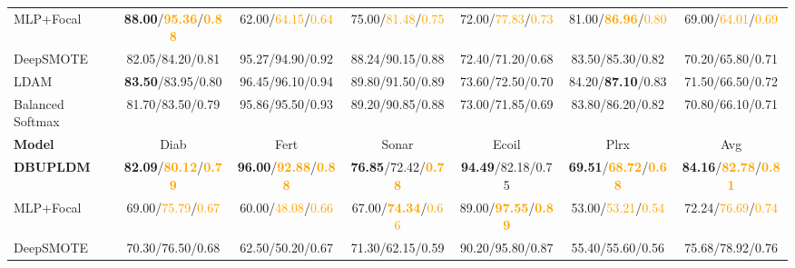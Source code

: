 \documentclass[a4paper]{cas-sc}
\begin{document}
\begin{table}[htbp]
{\begin{tabular}{lcccccc}
    MLP+Focal        & \textbf{88.00}/\textbf{\textcolor{orange}{95.36}}/\textbf{\textcolor{orange}{0.88}} & 62.00/\textcolor{orange}{64.15}/\textcolor{orange}{0.64} & 75.00/\textcolor{orange}{81.48}/\textcolor{orange}{0.75} & 72.00/\textcolor{orange}{77.83}/\textcolor{orange}{0.73} & 81.00/\textbf{\textcolor{orange}{86.96}}/\textcolor{orange}{0.80} & 69.00/\textcolor{orange}{64.01}/\textcolor{orange}{0.69} \\
    {\color{magenta}DeepSMOTE} & {\color{magenta}82.05/84.20/0.81} & {\color{magenta}95.27/94.90/0.92} & {\color{magenta}88.24/90.15/0.88} & {\color{magenta}72.40/71.20/0.68} & {\color{magenta}83.50/85.30/0.82} & {\color{magenta}70.20/65.80/0.71} \\
    {\color{magenta}LDAM} & {\color{magenta}\textbf{83.50}/83.95/0.80} & {\color{magenta}96.45/96.10/0.94} & {\color{magenta}89.80/91.50/0.89} & {\color{magenta}73.60/72.50/0.70} & {\color{magenta}84.20/\textbf{87.10}/0.83} & {\color{magenta}71.50/66.50/0.72} \\
    {\color{magenta}Balanced Softmax} & {\color{magenta}81.70/83.50/0.79} & {\color{magenta}95.86/95.50/0.93} & {\color{magenta}89.20/90.85/0.88} & {\color{magenta}73.00/71.85/0.69} & {\color{magenta}83.80/86.20/0.82} & {\color{magenta}70.80/66.10/0.71} \\
    \midrule
    \textbf{Model} & Diab & Fert & Sonar & Ecoil & Plrx & Avg \\
    \midrule
    \textbf{DBUPLDM} & \textbf{82.09}/\textbf{\textcolor{orange}{80.12}}/\textbf{\textcolor{orange}{0.79}} & \textbf{96.00}/\textbf{\textcolor{orange}{92.88}}/\textbf{\textcolor{orange}{0.88}} & \textbf{76.85}/{\color{orange}72.42}/\textbf{\textcolor{orange}{0.78}} & \textbf{94.49}/{\color{orange}82.18}/{\color{orange}0.75} & \textbf{69.51}/\textbf{\textcolor{orange}{68.72}}/\textbf{\textcolor{orange}{0.68}} & \textbf{84.16}/\textbf{\textcolor{orange}{82.78}}/\textbf{\textcolor{orange}{0.81}} \\
    MLP+Focal        & 69.00/\textcolor{orange}{75.79}/\textcolor{orange}{0.67} & 60.00/\textcolor{orange}{48.08}/\textcolor{orange}{0.66} & 67.00/\textbf{\textcolor{orange}{74.34}}/\textcolor{orange}{0.66} & 89.00/\textbf{\textcolor{orange}{97.55}}/\textbf{\textcolor{orange}{0.89}} & 53.00/\textcolor{orange}{53.21}/\textcolor{orange}{0.54} & 72.24/\textcolor{orange}{76.69}/\textcolor{orange}{0.74} \\
    {\color{magenta}DeepSMOTE} & {\color{magenta}70.30/76.50/0.68} & {\color{magenta}62.50/50.20/0.67} & {\color{magenta}71.30/62.15/0.59} & {\color{magenta}90.20/95.80/0.87} & {\color{magenta}55.40/55.60/0.56} & {\color{magenta}75.68/78.92/0.76} \\

\end{tabular}}
\end{table}
\end{document}
